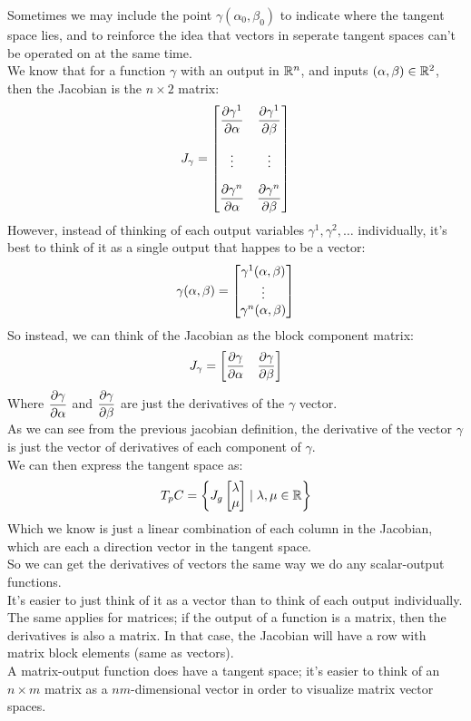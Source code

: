 \documentclass[12pt]{article}
\begin{document}
Sometimes we may include the point
$\gamma(\alpha_0, \beta_0)$ to indicate 
where the tangent space lies, and to reinforce
the idea that vectors in seperate tangent spaces
can't be operated on at the same time. \\

We know that for a function $\gamma$
with an output in $\mathbb{R}^n$,
and inputs $(\alpha, \beta) \in \mathbb{R}^2$,
then the Jacobian is the $n \times 2$ matrix:
\[ J_\gamma = \begin{bmatrix}
{\partialdd{\gamma^1}{\alpha}} & 
{\partialdd{\gamma^1}{\beta}} \vspace{10pt} \\
{\vdots} & {\vdots} \vspace{10pt} \\
{\partialdd{\gamma^n}{\alpha}} & 
{\partialdd{\gamma^n}{\beta}}
\end{bmatrix} \]
However, instead of thinking of each
output variables $\gamma^1, \gamma^2, \dots$
individually, it's best to think of it
as a single output that happes to be a vector:
\[ \gamma(\alpha, \beta) = 
\begin{bmatrix} {\gamma^1(\alpha, \beta)} \\
{\vdots} \\ {\gamma^n (\alpha, \beta)} \end{bmatrix} \]
So instead, we can think of the Jacobian
as the block component matrix:
\[ J_\gamma = \begin{bmatrix} 
{\dfrac{\partial \gamma}{\partial \alpha}} & 
{\dfrac{\partial \gamma}{\partial \beta}} \end{bmatrix} \]
Where $\dfrac{\partial \gamma}{\partial \alpha}$
and $\dfrac{\partial \gamma}{\partial \beta}$
are just the derivatives of the $\gamma$ vector. \\
As we can see from the previous jacobian definition,
the derivative of the vector $\gamma$
is just the vector of derivatives of each component
of $\gamma$. \\

We can then express the tangent space as:
\[ T_pC = \left\{  
J_g \begin{bmatrix} {\lambda} \\ {\mu} \end{bmatrix}
\mid \lambda, \mu \in \mathbb{R}  \right\} \]
Which we know is just a linear combination of each
column in the Jacobian, which are each
a direction vector in the tangent space. \\

So we can get the derivatives of vectors
the same way we do any scalar-output functions. \\
It's easier to just think of it as a vector
than to think of each output individually. \\

The same applies for matrices;
if the output of a function is a matrix,
then the derivatives is also a matrix. 
In that case, the Jacobian will have a row
with matrix block elements (same as vectors). \\
A matrix-output function does have a tangent space;
it's easier to think of an $n \times m$ matrix
as a $nm$-dimensional vector in order to visualize
matrix vector spaces. \\
\end{document}
